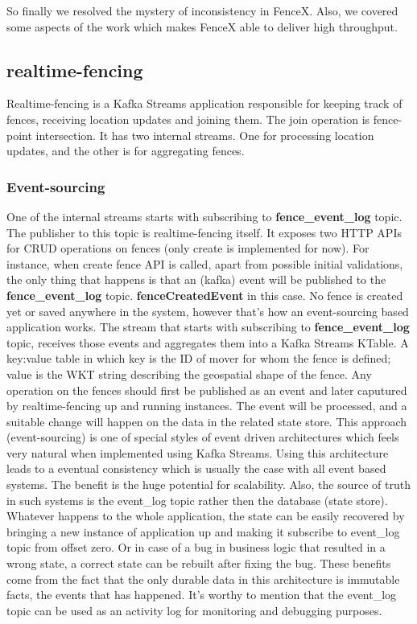 \documentclass[a4]{report}
\begin{document}
    So finally we resolved the mystery of inconsistency in FenceX. Also, we covered some aspects of the work which
    makes FenceX able to deliver high throughput.

    \subsection{realtime-fencing}
    Realtime-fencing is a Kafka Streams application responsible for keeping track of fences, receiving location updates
    and joining them.
    The join operation is fence-point intersection.
    It has two internal streams.
    One for processing location updates, and the other is for aggregating fences.

    \subsubsection{Event-sourcing}
    One of the internal streams starts with subscribing to \textbf{fence\_event\_log} topic.
    The publisher to this topic is realtime-fencing itself.
    It exposes two HTTP APIs for CRUD operations on fences (only create is implemented for now).
    For instance, when create fence API is called, apart from possible initial validations, the
    only thing that happens is that an (kafka) event will be published to the \textbf{fence\_event\_log} topic.
    \textbf{fenceCreatedEvent} in this case.
    No fence is created yet or saved anywhere in the system, however that's how an event-sourcing based application
    works.
    The stream that starts with subscribing to \textbf{fence\_event\_log} topic, receives those events and aggregates
    them into a Kafka Streams KTable.
    A key:value table in which key is the ID of mover for whom the fence is defined;
    value is the WKT string describing the geospatial shape of the fence.
    Any operation on the fences should first be published as an event and later caputured by realtime-fencing up and
    running instances.
    The event will be processed, and a suitable change will happen on the data in the related state store.
    This approach (event-sourcing) is one of special styles of event driven architectures which feels very natural
    when implemented using Kafka Streams.
    Using this architecture leads to a eventual consistency which is usually the case with all event based systems.
    The benefit is the huge potential for scalability.
    Also, the source of truth in such systems is the event\_log topic rather then the database (state store).
    Whatever happens to the whole application, the state can be easily recovered by bringing a new instance of
    application up and making it subscribe to event\_log topic from offset zero.
    Or in case of a bug in business logic that resulted in a wrong state, a correct state can be rebuilt after fixing
    the bug.
    These benefits come from the fact that the only durable data in this architecture is immutable facts, the
    events that has happened.
    It's worthy to mention that the event\_log topic can be used as an activity log for monitoring and debugging purposes.
\end{document}
